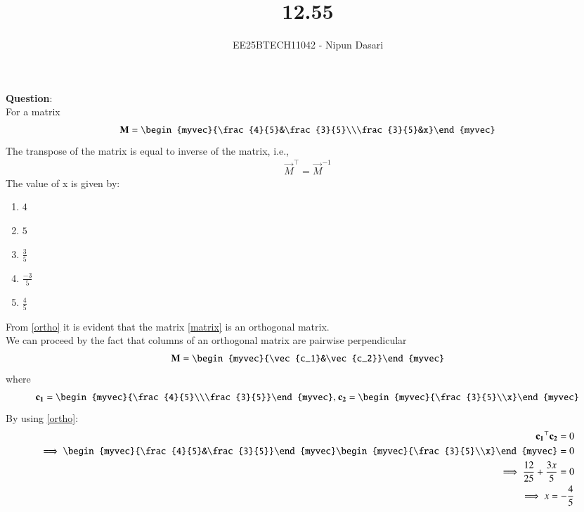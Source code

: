 \documentclass[journal]{IEEEtran}
\begin{document}
	
	
	\vspace{3cm}
	
	\title{12.55}
	\author{EE25BTECH11042 - Nipun Dasari}
	\maketitle
	
	\renewcommand{\thefigure}{\theenumi}
	\renewcommand{\thetable}{\theenumi}
	\setlength{\intextsep}{10pt}
	
	\renewcommand{\thetable}{\theenumi}
	
	\textbf{Question}:\\
	For a matrix \\
	\begin{align}
		\vec{M}=\begin{myvec}{\frac{4}{5}&\frac{3}{5}\\\frac{3}{5}&x}\end{myvec} \label{matrix}
	\end{align}
	The transpose of the matrix is equal to inverse of the matrix, i.e., 
	\begin{align}
		\vec{M}^\top = \vec{M}^{-1} \label{ortho}
	\end{align}
	The value of x is given by:\\
	\begin{enumerate}
		\item $4$
		\item $5$
		\item $\frac{3}{5}$
		\item $\frac{-3}{5}$
		\item $\frac{4}{5}$
	\end{enumerate}
	\solution
	From \eqref{ortho} it is evident that the matrix \eqref{matrix} is an orthogonal matrix.\\
	We can proceed by the fact that columns of an orthogonal matrix are pairwise perpendicular
	\begin{align}
		\vec{M} = \begin{myvec}{\vec{c_1}&\vec{c_2}}\end{myvec}
	\end{align} 
	where
	\begin{align}
		\vec{c_1} = \begin{myvec}{\frac{4}{5}\\\frac{3}{5}}\end{myvec}\text{, }\vec{c_2} = \begin{myvec}{\frac{3}{5}\\x}\end{myvec}
	\end{align}
	By using \eqref{ortho}:
	\begin{align}
		\vec{c_1}^\top\vec{c_2} = 0\\
		\implies \begin{myvec}{\frac{4}{5}&\frac{3}{5}}\end{myvec}\begin{myvec}{\frac{3}{5}\\x}\end{myvec} = 0\\
		\implies \frac{12}{25} + \frac{3x}{5} = 0\\
		\implies x = -\frac{4}{5}
	\end{align}
\end{document}
